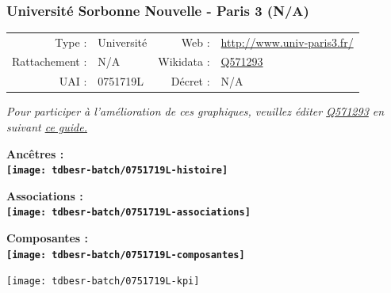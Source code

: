 \documentclass[12pt,french,]{article}
\begin{document}
\ifoddpage ~\newpage \fi   

\hypertarget{universituxe9-sorbonne-nouvelle---paris-3-na}{%
\subsubsection{Université Sorbonne Nouvelle - Paris 3
(N/A)}\label{universituxe9-sorbonne-nouvelle---paris-3-na}}

\begin{tabular*}{\textwidth}{rp{5cm}rl}  
\hline  
Type : & Université & Web : &\href{http://www.univ-paris3.fr/}{http://www.univ-paris3.fr/} \\  
Rattachement : & N/A & Wikidata : & \href{https://www.wikidata.org/entity/Q571293}{Q571293} \\  
UAI : & 0751719L & Décret : & N/A \\  
\hline  
\end{tabular*}

\textit{\scriptsize Pour participer à l'amélioration de ces graphiques, veuillez éditer  \href{https://www.wikidata.org/entity/Q571293}{Q571293}  en suivant \href{https://github.com/cpesr/wikidataESR/blob/master/Rmd/wikidataESR.md}{ce guide.}}

\vspace{1cm}  
\begin{minipage}[b]{0.50\textwidth}\begin{center} \bf Ancêtres : \\  
\texttt{[image: tdbesr-batch/0751719L-histoire]} \end{center}\end{minipage}\begin{minipage}[b]{0.50\textwidth}\begin{center} \bf Associations : \\  
\texttt{[image: tdbesr-batch/0751719L-associations]} \end{center}\end{minipage}

\hrulefill

\begin{center} \bf Composantes : \\  
\texttt{[image: tdbesr-batch/0751719L-composantes]} \end{center}

\begin{center}\texttt{[image: tdbesr-batch/0751719L-kpi]} \end{center}\checkoddpage

\ifoddpage ~\newpage \fi   
\end{document}
